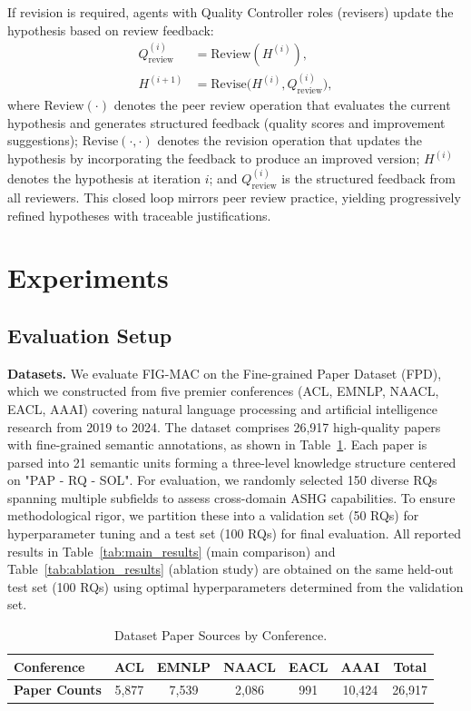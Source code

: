 \documentclass[runningheads]{llncs}
\begin{document}
If revision is required, agents with Quality Controller roles (revisers) update the hypothesis based on review feedback:
\begin{align}
    Q_{\text{review}}^{(i)} &= \text{Review}(H^{(i)}), \\
    H^{(i+1)} &= \text{Revise}\big(H^{(i)}, Q_{\text{review}}^{(i)}\big),
\end{align}
where $\text{Review}(\cdot)$ denotes the peer review operation that evaluates the current hypothesis and generates structured feedback (quality scores and improvement suggestions); $\text{Revise}(\cdot, \cdot)$ denotes the revision operation that updates the hypothesis by incorporating the feedback to produce an improved version; $H^{(i)}$ denotes the hypothesis at iteration $i$; and $Q_{\text{review}}^{(i)}$ is the structured feedback from all reviewers. This closed loop mirrors peer review practice, yielding progressively refined hypotheses with traceable justifications.



\section{Experiments}
\subsection{Evaluation Setup}

\textbf{Datasets.} We evaluate FIG-MAC on the Fine-grained Paper Dataset (FPD), which we constructed from five premier conferences (ACL, EMNLP, NAACL, EACL, AAAI) covering natural language processing and artificial intelligence research from 2019 to 2024. The dataset comprises 26,917 high-quality papers with fine-grained semantic annotations, as shown in Table~\ref{tab:dataset_sources}. Each paper is parsed into 21 semantic units forming a three-level knowledge structure centered on "PAP - RQ - SOL". For evaluation, we randomly selected 150 diverse RQs spanning multiple subfields to assess cross-domain ASHG capabilities. To ensure methodological rigor, we partition these into a validation set (50 RQs) for hyperparameter tuning and a test set (100 RQs) for final evaluation. All reported results in Table~\ref{tab:main_results} (main comparison) and Table~\ref{tab:ablation_results} (ablation study) are obtained on the same held-out test set (100 RQs) using optimal hyperparameters determined from the validation set.

\begin{table}[t]
\centering
\small
\begin{tabular}{lcccccc}
\toprule
\textbf{Conference} & ACL & EMNLP & NAACL & EACL & AAAI & \textbf{Total} \\
\midrule
\textbf{Paper Counts} & 5,877 & 7,539 & 2,086 & 991 & 10,424 & 26,917 \\
\bottomrule
\end{tabular}
\caption{Dataset Paper Sources by Conference.}
\label{tab:dataset_sources}
\end{table}
\end{document}
